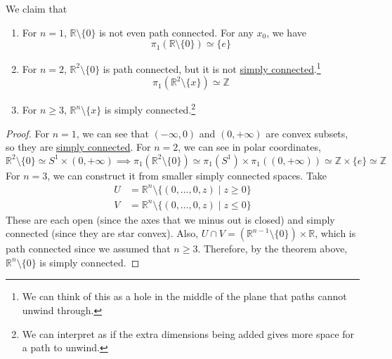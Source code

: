   \begin{theorem}
    \label{thm:fundamental-groups-of-rn-minus-a-point}
    We claim that 
    \begin{enumerate}
      \item For $n = 1$, $\mathbb{R} \setminus \{0\}$ is not even path connected. For any $x_0$, we have 
        \begin{equation}
          \pi_1 (\mathbb{R} \setminus \{0\}) \simeq \{e\}
        \end{equation}

      \item For $n = 2$, $\mathbb{R}^2 \setminus \{0\}$ is path connected, but it is not \hyperref[def:simply-connected]{simply connected}.\footnote{We can think of this as a hole in the middle of the plane that paths cannot unwind through.}
        \begin{equation}
          \pi_1(\mathbb{R}^2 \setminus \{x\}) \simeq \mathbb{Z}
        \end{equation}

      \item For $n \geq 3$, $\mathbb{R}^n \setminus \{x\}$ is simply connected.\footnote{We can interpret as if the extra dimensions being added gives more space for a path to unwind.}
    \end{enumerate}
  \end{theorem}
  \begin{proof}
    For $n = 1$, we can see that $(-\infty, 0)$ and $(0, +\infty)$ are convex subsets, so they are \hyperref[def:simply-connected]{simply connected}. For $n = 2$, we can see in polar coordinates, 
    \begin{equation}
      \mathbb{R}^2 \setminus \{0\} \simeq S^1 \times (0, +\infty) \implies \pi_1 (\mathbb{R}^2 \setminus \{0\}) \simeq \pi_1 (S^1) \times \pi_1 ((0, +\infty)) \simeq \mathbb{Z} \times \{e\} \simeq \mathbb{Z}
    \end{equation}
    For $n = 3$, we can construct it from smaller simply connected spaces. Take 
    \begin{align}
      U & = \mathbb{R}^n \setminus \{(0, \ldots, 0, z) \mid z \geq 0\} \\
      V & = \mathbb{R}^n \setminus \{(0, \ldots, 0, z) \mid z \leq 0\}
    \end{align}
    These are each open (since the axes that we minus out is closed) and simply connected (since they are star convex). Also, $U \cap V = (\mathbb{R}^{n-1} \setminus \{0\}) \times \mathbb{R}$, which is path connected since we assumed that $n \geq 3$. Therefore, by the theorem above, $\mathbb{R}^n \setminus \{0\}$ is simply connected. 
  \end{proof}


